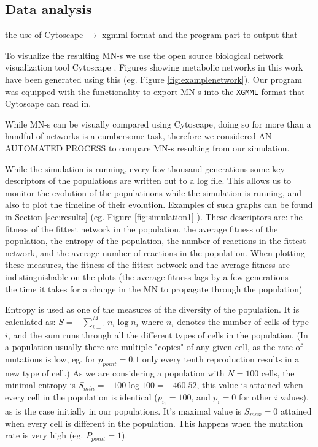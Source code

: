 \documentclass[10pt,a4paper]{article}
\begin{document}
\subsection{Data analysis}
\label{sub:visualization}

the use of Cytoscape $\rightarrow$ xgmml format and the  program part to output that

To visualize the resulting MN-s we use the open source biological network visualization tool Cytoscape \cite{cytoscape}. Figures showing metabolic networks in this work have been generated using this (eg.  Figure \ref{fig:examplenetwork}). Our program was equipped with the functionality to export MN-s into the \texttt{XGMML} format that Cytoscape can read in. 

While MN-s can be visually compared using Cytoscape, doing so for more than a handful of networks is a cumbersome task, therefore we considered AN AUTOMATED PROCESS to compare MN-s resulting from our simulation. 

While the simulation is running, every few thousand generations some key descriptors of the populations are written out to a log file. This allows us to monitor the evolution of the populatinons while the simulation is running, and also to plot the timeline of their evolution. Examples of such graphs can be found in Section \ref{sec:results} (eg. Figure \ref{fig:simulation1} ). These descriptors are: the fitness of the fittest network in the population, the average fitness of the population, the entropy of the population, the number of reactions in the fittest network, and the average number of reactions in the population. When plotting these measures, the fitness of the fittest network and the average fitness are indistinguishable on the plots (the average fitness lags by a few generations --- the time it takes for a change in the MN to propagate through the population)

Entropy is used as one of the measures of the diversity of the population. It is calculated as: $S=- \sum^{M}_{i=1} n_i \log n_i $ where $n_i$ denotes the number of cells of type $i$, and the sum runs through all the different types of cells in the population. (In a population usually there are multiple "copies" of any given cell, as the rate of mutations is low, eg. for $p_{point}=0.1$ only every tenth reproduction results in a new type of cell.) As we are considering a population with $N=100$ cells, the minimal entropy is $S_{min}=-100\log100=-460.52$, this value is attained when every cell in the population is identical ($p_{i_1}=100$, and $p_i=0$ for other $i$ values), as is the case initially in our populations. It's maximal value is $S_{max}=0$ attained when every cell is different in the population. This happens when the mutation rate is very high (eg. $P_{point}=1$). 
\end{document}
